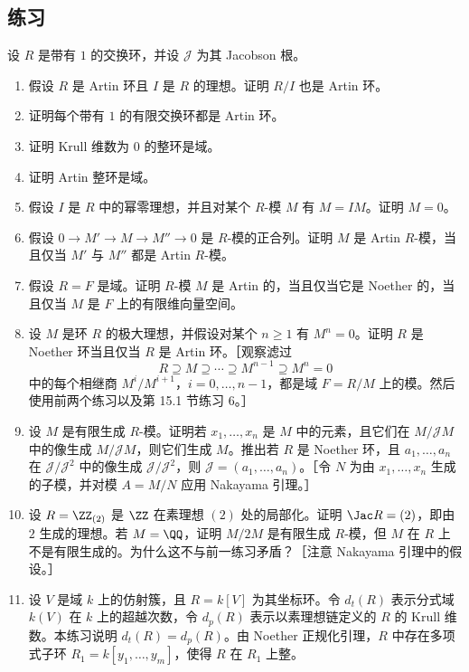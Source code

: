 \subsection*{练习}

设 $R$ 是带有 $1$ 的交换环，并设 $\mathcal J$ 为其 Jacobson 根。
\begin{enumerate}[label=\arabic*.]
  \item 假设 $R$ 是 Artin 环且 $I$ 是 $R$ 的理想。证明 $R/I$ 也是 Artin 环。
  \item 证明每个带有 $1$ 的有限交换环都是 Artin 环。
  \item 证明 Krull 维数为 $0$ 的整环是域。
  \item 证明 Artin 整环是域。
  \item 假设 $I$ 是 $R$ 中的幂零理想，并且对某个 $R$-模 $M$ 有 $M=IM$。证明 $M=0$。
  \item 假设 $0\to M'\to M\to M''\to0$ 是 $R$-模的正合列。证明 $M$ 是 Artin $R$-模，当且仅当 $M'$ 与 $M''$ 都是 Artin $R$-模。
  \item 假设 $R=F$ 是域。证明 $R$-模 $M$ 是 Artin 的，当且仅当它是 Noether 的，当且仅当 $M$ 是 $F$ 上的有限维向量空间。
  \item 设 $M$ 是环 $R$ 的极大理想，并假设对某个 $n\geq1$ 有 $M^n=0$。证明 $R$ 是 Noether 环当且仅当 $R$ 是 Artin 环。［观察滤过
  \[
    R\supseteq M\supseteq\cdots\supseteq M^{n-1}\supseteq M^n=0
  \]
  中的每个相继商 $M^i/M^{i+1}$，$i=0,\ldots,n-1$，都是域 $F=R/M$ 上的模。然后使用前两个练习以及第 15.1 节练习 6。］
  \item 设 $M$ 是有限生成 $R$-模。证明若 $x_1,\ldots,x_n$ 是 $M$ 中的元素，且它们在 $M/\mathcal JM$ 中的像生成 $M/\mathcal JM$，则它们生成 $M$。推出若 $R$ 是 Noether 环，且 $a_1,\ldots,a_n$ 在 $\mathcal J/\mathcal J^2$ 中的像生成 $\mathcal J/\mathcal J^2$，则 $\mathcal J=(a_1,
  \ldots,a_n)$。［令 $N$ 为由 $x_1,\ldots,x_n$ 生成的子模，并对模 $A=M/N$ 应用 Nakayama 引理。］
  \item 设 $R=\ZZ_{(2)}$ 是 $\ZZ$ 在素理想 $(2)$ 处的局部化。证明 $\Jac R=(2)$，即由 $2$ 生成的理想。若 $M=\QQ$，证明 $M/2M$ 是有限生成 $R$-模，但 $M$ 在 $R$ 上不是有限生成的。为什么这不与前一练习矛盾？［注意 Nakayama 引理中的假设。］
  \item 设 $V$ 是域 $k$ 上的仿射簇，且 $R=k[V]$ 为其坐标环。令 $d_t(R)$ 表示分式域 $k(V)$ 在 $k$ 上的超越次数，令 $d_p(R)$ 表示以素理想链定义的 $R$ 的 Krull 维数。本练习说明 $d_t(R)=d_p(R)$。由 Noether 正规化引理，$R$ 中存在多项式子环 $R_1=k[y_1,
  \ldots,y_m]$，使得 $R$ 在 $R_1$ 上整。
  \begin{enumerate}[label=(\alph*)]

\end{enumerate}
\end{enumerate}
